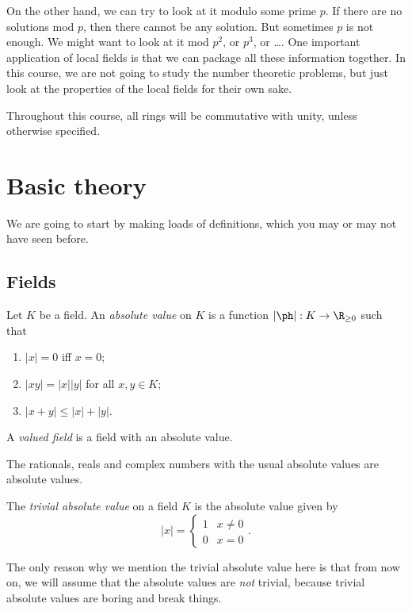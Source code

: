 \documentclass[a4paper]{article}
\begin{document}
On the other hand, we can try to look at it modulo some prime $p$. If there are no solutions mod $p$, then there cannot be any solution. But sometimes $p$ is not enough. We might want to look at it mod $p^2$, or $p^3$, or \ldots. One important application of local fields is that we can package all these information together. In this course, we are not going to study the number theoretic problems, but just look at the properties of the local fields for their own sake.

Throughout this course, all rings will be commutative with unity, unless otherwise specified.
\section{Basic theory}
We are going to start by making loads of definitions, which you may or may not have seen before.

\subsection{Fields}

\begin{defi}
  Let $K$ be a field. An \emph{absolute value} on $K$ is a function $|\ph|: K \to \R_{\geq 0}$ such that
  \begin{enumerate}
    \item $|x| = 0$ iff $x = 0$;
    \item $|xy| = |x||y|$ for all $x, y \in K$;
    \item $|x + y| \leq |x| + |y|$.
  \end{enumerate}
\end{defi}

\begin{defi}
  A \emph{valued field} is a field with an absolute value.
\end{defi}

\begin{eg}
  The rationals, reals and complex numbers with the usual absolute values are absolute values.
\end{eg}

\begin{eg}
  The \emph{trivial absolute value} on a field $K$ is the absolute value given by
  \[
    |x| =
    \begin{cases}
      1 & x \not= 0\\
      0 & x = 0
    \end{cases}.
  \]
\end{eg}
The only reason why we mention the trivial absolute value here is that from now on, we will assume that the absolute values are \emph{not} trivial, because trivial absolute values are boring and break things.
\end{document}
